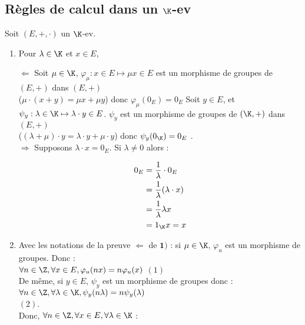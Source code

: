 \documentclass[12pt, a4paper]{report}
\begin{document}
\subsection{Règles de calcul dans un $\K$-ev}


Soit $(E,+,\cdot)$ un $\K$-ev.

\begin{enumerate}

	\item Pour $\lambda \in \K$ et $x \in E$, 
	
	\begin{demo}

	$\Longleftarrow$ Soit $\mu \in \K$, $\varphi_\mu : x \in E \mapsto \mu x \in E$ est un morphisme de groupes de $(E,+)$ dans $(E,+)$ \\
	($\mu \cdot (x+y) = \mu x + \mu y$) donc $\varphi_\mu (0_E) = 0_E$ \ie {}
	Soit $y \in E$, et $\psi_y : \lambda \in \K \mapsto \lambda \cdot y \in E$. $\psi_y$ est un morphisme de groupes de $(\K,+)$ dans $(E,+)$ \\
	($(\lambda + \mu) \cdot y = \lambda \cdot y + \mu \cdot y$) donc $\psi_y(0_\K) = 0_E$ \ie {}. \\
	
	$\Longrightarrow$ Supposons $\lambda \cdot x = 0_E$. Si $\lambda \ne 0$ alors :
	
	\begin{align*}
	0_E &= \dfrac{1}{\lambda} \cdot 0_E \\
	&= \dfrac{1}{\lambda} (\lambda \cdot x) \\
	&= \dfrac{1}{\lambda} \lambda x \\
	&= 1_\K x = x
	\end{align*}
	
	\ie {}
	
	\end{demo}
	
	\item Avec les notations de la preuve $\Longleftarrow$ de $\textbf{1)}$ : si $\mu \in \K$, $\varphi_u$ est un morphisme de groupes. Donc : \\
	
	$\forall n \in \Z, \forall x \in E, \varphi_u(nx) = n \varphi_u(x)$ \ie {} \quad $(1)$ \\
	
	De même, si $y \in E$, $\psi_y$ est un morphisme de groupes donc : \\
	$\forall n \in \Z, \forall \lambda \in \K, \psi_y(n\lambda) = n \psi_y(\lambda)$ \ie \\
	 \quad $(2)$. \\
	Donc, $\forall n \in \Z, \forall x \in E, \forall \lambda \in \K$ :  \\
	

\end{enumerate}
\end{document}
